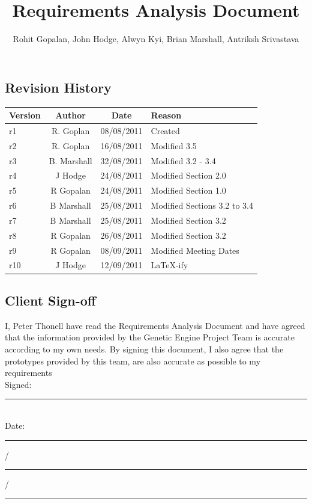 
\title{Requirements Analysis Document}
\author{Rohit Gopalan, John Hodge, Alwyn Kyi, Brian Marshall, Antriksh Srivastava}

\pagestyle{fancy}
\renewcommand{\headheight}{15pt}
\fancyhead{} \fancyfoot{}
\fancyfoot[R]{\thepage \slash \pageref{LastPage}}	%
\renewcommand{\headrulewidth}{0.4pt} \renewcommand{\footrulewidth}{0.4pt}
\renewcommand{\headsep}{24pt}



\maketitle

\subsection*{Revision History}
\begin{tabularx}{\textwidth}{l c c X}
 \hline
 Version & Author & Date & Reason \\
 \hline \hline
 r1 & R. Goplan & 08/08/2011 & Created \\ \hline
 r2 & R. Goplan & 16/08/2011 & Modified 3.5 \\ \hline
 r3 & B. Marshall & 32/08/2011 & Modified 3.2 - 3.4 \\ \hline
 r4 & J Hodge & 24/08/2011 & Modified Section 2.0 \\ \hline
 r5 & R Gopalan & 24/08/2011 & Modified Section 1.0 \\ \hline
 r6 & B Marshall & 25/08/2011 & Modified Sections 3.2 to 3.4 \\ \hline
 r7 & B Marshall & 25/08/2011 & Modified Section 3.2 \\ \hline
 r8 & R Gopalan & 26/08/2011 & Modified Section 3.2 \\ \hline
 r9 & R Gopalan & 08/09/2011 & Modified Meeting Dates \\ \hline
 r10 & J Hodge & 12/09/2011 & LaTeX-ify \\ \hline
\end{tabularx}

\subsection*{Client Sign-off}
I, Peter Thonell have read the Requirements Analysis Document and have agreed that the information provided by the Genetic Engine Project Team is accurate according to my own needs. By signing this document, I also agree that the prototypes provided by this team, are also accurate as possible to my requirements
\\[10pt]
Signed: \rule{3cm}{.7pt}
\\[10pt]
Date: \rule{0.8cm}{.7pt} \slash \rule{0.8cm}{.7pt} \slash \rule{3cm}{.7pt}


